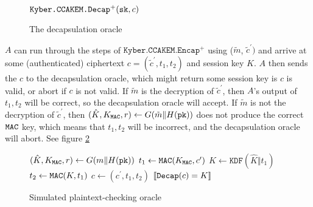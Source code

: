 \documentclass{article}
\begin{document}
\begin{figure}[H]
    \centering
    \begin{minipage}{0.5\textwidth}
        \begin{algorithm}[H]
            \caption{$\decap(c)$}
            \begin{algorithmic}[1]
                \State \Return $\texttt{Kyber.CCAKEM.Decap}^+(\texttt{sk}, c)$
            \end{algorithmic}
        \end{algorithm}
    \end{minipage}
    \caption{The decapsulation oracle}\label{fig:decap-oracle}
\end{figure}

$A$ can run through the steps of $\texttt{Kyber.CCAKEM.Encap}^+$ using ($\tilde{m}$, $\tilde{c}^\prime)$ and arrive at some (authenticated) ciphertext $c = (\tilde{c}^\prime, t_1, t_2)$ and session key $K$. $A$ then sends the $c$ to the decapsulation oracle, which might return some session key is $c$ is valid, or abort if $c$ is not valid. If $\tilde{m}$ is the decryption of $\tilde{c}^\prime$, then $A$'s output of $t_1, t_2$ will be correct, so the decapsulation oracle will accept. If $\tilde{m}$ is not the decryption of $\tilde{c}^\prime$, then $(\hat{K}, K_{\texttt{MAC}}, r) \leftarrow G(\tilde{m} \Vert H(\texttt{pk}))$ does not produce the correct $\texttt{MAC}$ key, which means that $t_1, t_2$ will be incorrect, and the decapsulation oracle will abort. See figure \ref{fig:simulated-pco}

\begin{figure}[H]
    \centering
    \begin{algorithm}[H]
        \caption{$\pco_1(m, c^\prime)$}
        \begin{algorithmic}[1]
            \State $(\hat{K}, K_{\texttt{MAC}}, r) \leftarrow G(m \Vert H(\texttt{pk}))$
            \State $t_1 \leftarrow \texttt{MAC}(K_{\texttt{MAC}}, c^\prime)$
            \State $K \leftarrow \texttt{KDF}(\hat{K} \Vert t_1)$
            \State $t_2 \leftarrow \texttt{MAC}(K, t_1)$
            \State $c \leftarrow (c^\prime, t_1, t_2)$
            \State \Return $[\![ \texttt{Decap}(c) = K ]\!]$
        \end{algorithmic}
    \end{algorithm}
    \caption{Simulated plaintext-checking oracle}\label{fig:simulated-pco}
\end{figure}
\end{document}
